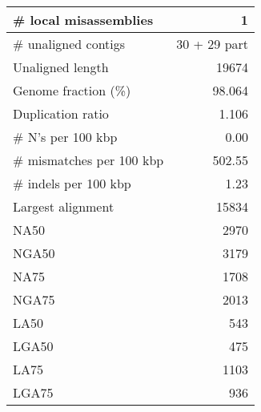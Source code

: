 \documentclass[12pt,a4paper]{article}
\begin{document}
\begin{table}[ht]
\begin{center}
\begin{tabular}{|l*{1}{|r}|}
\# local misassemblies & 1 \\ \hline
\# unaligned contigs & 30 + 29 part \\ \hline
Unaligned length & 19674 \\ \hline
Genome fraction (\%) & 98.064 \\ \hline
Duplication ratio & 1.106 \\ \hline
\# N's per 100 kbp & 0.00 \\ \hline
\# mismatches per 100 kbp & 502.55 \\ \hline
\# indels per 100 kbp & 1.23 \\ \hline
Largest alignment & 15834 \\ \hline
NA50 & 2970 \\ \hline
NGA50 & 3179 \\ \hline
NA75 & 1708 \\ \hline
NGA75 & 2013 \\ \hline
LA50 & 543 \\ \hline
LGA50 & 475 \\ \hline
LA75 & 1103 \\ \hline
LGA75 & 936 \\ \hline
\end{tabular}
\end{center}
\end{table}
\end{document}
